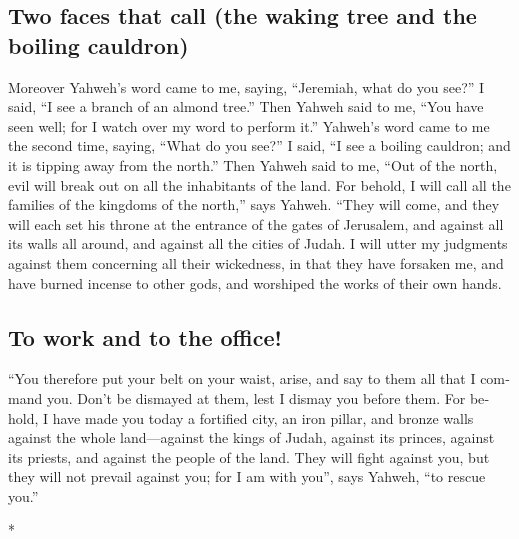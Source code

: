 \begin{paracol}{2}
\begin{otherlanguage}{english}
\hypertarget{two-faces-that-call-the-waking-tree-and-the-boiling-cauldron}{%
\subsection{Two faces that call (the waking tree and the boiling
cauldron)}\label{two-faces-that-call-the-waking-tree-and-the-boiling-cauldron}}

 Moreover Yahweh's word came to me, saying, ``Jeremiah,
what do you see?'' I said, ``I see a branch of an almond tree.''
 Then Yahweh said to me, ``You have seen well; for I
watch over my word to perform it.''  Yahweh's word came
to me the second time, saying, ``What do you see?'' I said, ``I see a
boiling cauldron; and it is tipping away from the north.''
 Then Yahweh said to me, ``Out of the north, evil will
break out on all the inhabitants of the land.  For
behold, I will call all the families of the kingdoms of the north,''
says Yahweh. ``They will come, and they will each set his throne at the
entrance of the gates of Jerusalem, and against all its walls all
around, and against all the cities of Judah.  I will
utter my judgments against them concerning all their wickedness, in that
they have forsaken me, and have burned incense to other gods, and
worshiped the works of their own hands.

\hypertarget{to-work-and-to-the-office}{%
\subsection{To work and to the
office!}\label{to-work-and-to-the-office}}

 ``You therefore put your belt on your waist, arise, and
say to them all that I command you. Don't be dismayed at them, lest I
dismay you before them.  For behold, I have made you
today a fortified city, an iron pillar, and bronze walls against the
whole land---against the kings of Judah, against its princes, against
its priests, and against the people of the land.  They
will fight against you, but they will not prevail against you; for I am
with you'', says Yahweh, ``to rescue you.''

\end{otherlanguage}

\switchcolumn[0]*

\hypertarget{la-lealtad-inicial-de-israel-a-su-dios-y-su-posterior-apostasuxeda-desdeuxf1osa-con-sus-desastrosas-consecuencias}{%
}
\end{paracol}
